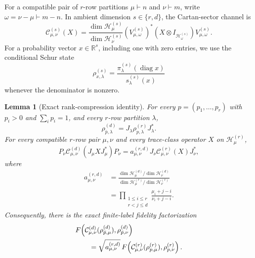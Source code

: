 \documentclass[11pt]{article}
\newtheorem{lemma}[lemma]{Lemma}
\theoremstyle{remark}
\theoremstyle{plain}
\newcommand{\R}{\mathbb R}
\newcommand{\cC}{\mathcal C}
\newcommand{\cH}{\mathcal H}
\newcommand{\diag}{\operatorname{diag}}
\newcommand{\ot}{\otimes}
\begin{document}
For a compatible pair of \(r\)-row partitions \(\mu\vdash n\) and
\(\nu\vdash m\), write \(\omega=\nu-\mu\vdash m-n\).  In ambient
dimension \(s\in\{r,d\}\), the Cartan-sector channel is
\[
  \cC_{\mu,\nu}^{(s)}(X)
  =\frac{\dim\cH_\mu^{(s)}}{\dim\cH_\nu^{(s)}}
   (V_{\mu,\omega}^{(s)})^*
   (X\ot I_{\cH_\omega^{(s)}})
   V_{\mu,\omega}^{(s)}.
\]
For a probability vector \(x\in\R^s\), including one with zero entries, we
use the conditional Schur state
\[
  \rho_{x,\lambda}^{(s)}
  =\frac{\pi_\lambda^{(s)}(\diag x)}{s_\lambda^{(s)}(x)}
\]
whenever the denominator is nonzero.

\begin{lemma}[Exact rank-compression identity]
\label{lem:exact-compression}
For every \(p=(p_1,\ldots,p_r)\) with \(p_i>0\) and
\(\sum_i p_i=1\), and every \(r\)-row partition \(\lambda\),
\begin{equation}
  \rho_{\bar p,\lambda}^{(d)}
  =J_\lambda\rho_{p,\lambda}^{(r)}J_\lambda^*.
  \label{eq:conditional-support}
\end{equation}
For every compatible \(r\)-row pair \(\mu,\nu\) and every trace-class
operator \(X\) on \(\cH_\mu^{(r)}\),
\begin{equation}
  P_\nu\cC_{\mu,\nu}^{(d)}(J_\mu XJ_\mu^*)P_\nu
  =a_{\mu,\nu}^{(r,d)}
   J_\nu\cC_{\mu,\nu}^{(r)}(X)J_\nu^*,
  \label{eq:channel-compression}
\end{equation}
where
\begin{align}
  a_{\mu,\nu}^{(r,d)}
  &=\frac{
     \dim\cH_\mu^{(d)}/\dim\cH_\nu^{(d)}}{
     \dim\cH_\mu^{(r)}/\dim\cH_\nu^{(r)}}
  \label{eq:a-dimension-ratio}\\
  &=\prod_{\substack{1\le i\le r\\r<j\le d}}
    \frac{\mu_i+j-i}{\nu_i+j-i}.
  \label{eq:a-product}
\end{align}
Consequently, there is the exact finite-label fidelity factorization
\begin{align}
 &F\!\left(
   \cC_{\mu,\nu}^{(d)}(\rho_{\bar p,\mu}^{(d)}),
   \rho_{\bar p,\nu}^{(d)}
 \right)\notag\\
 &\qquad=\sqrt{a_{\mu,\nu}^{(r,d)}}\,
 F\!\left(
   \cC_{\mu,\nu}^{(r)}(\rho_{p,\mu}^{(r)}),
   \rho_{p,\nu}^{(r)}
 \right).
 \label{eq:exact-sector-factorization}
\end{align}
\end{lemma}
\end{document}
